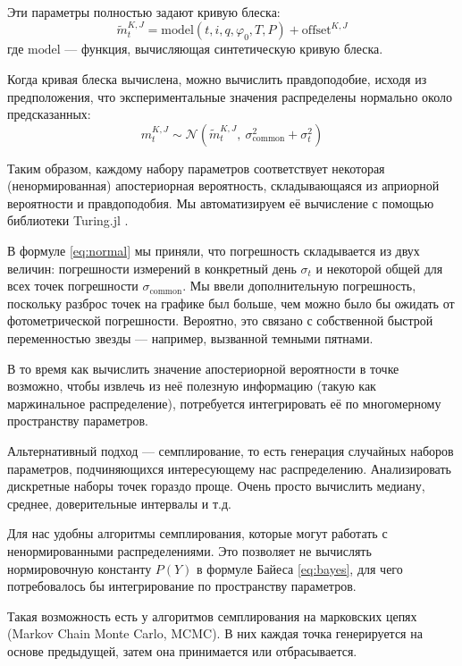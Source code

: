 Эти параметры полностью задают кривую блеска:
\[
\tilde m_t^{K, J} = \text{model}(t, i, q, \varphi_0, T, P) + \text{offset}^{K, J}
\]
где $\text{model}$ --- функция, вычисляющая синтетическую кривую блеска.

Когда кривая блеска вычислена, можно вычислить правдоподобие, исходя из предположения, что экспериментальные значения распределены нормально около предсказанных:
\begin{equation}
m_t^{K, J} \sim \mathcal N (\tilde m_t^{K, J},\ \sigma_\text{common}^2 + \sigma_t^2)
\label{eq:normal}
\end{equation}

Таким образом, каждому набору параметров соответствует некоторая (ненормированная) апостериорная вероятность, складывающаяся из априорной вероятности и правдоподобия. Мы автоматизируем её вычисление с помощью библиотеки Turing.jl \cite{Turing}.

В формуле \eqref{eq:normal} мы приняли, что погрешность складывается из двух величин: погрешности измерений в конкретный день $\sigma_t$ и некоторой общей для всех точек погрешности $\sigma_\text{common}$. Мы ввели дополнительную погрешность, поскольку разброс точек на графике был больше, чем можно было бы ожидать от фотометрической погрешности. Вероятно, это связано с собственной быстрой переменностью звезды --- например, вызванной темными пятнами.



В то время как вычислить значение апостериорной вероятности в точке возможно, чтобы извлечь из неё полезную информацию (такую как маржинальное распределение), потребуется интегрировать её по многомерному пространству параметров.

Альтернативный подход --- семплирование, то есть генерация случайных наборов параметров, подчиняющихся интересующему нас распределению. Анализировать дискретные наборы точек гораздо проще. Очень просто вычислить медиану, среднее, доверительные интервалы и т.д.

Для нас удобны алгоритмы семплирования, которые могут работать с ненормированными распределениями. Это позволяет не вычислять нормировочную константу $P(Y)$ в формуле Байеса \eqref{eq:bayes}, для чего потребовалось бы интегрирование по пространству параметров.

Такая возможность есть у алгоритмов семплирования на марковских цепях (Markov Chain Monte Carlo, MCMC). В них каждая точка генерируется на основе предыдущей, затем она принимается или отбрасывается.

